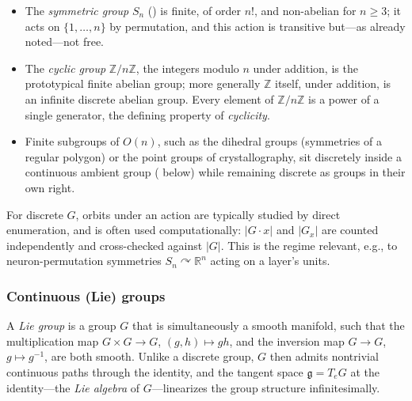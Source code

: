 \documentclass[mathematics,review,submit,moreauthors]{Definitions/mdpi}
\begin{document}
\begin{Example}
\label{ex:discrete-groups}
\begin{itemize}
    \item The \emph{symmetric group} $S_n$ () is
    finite, of order $n!$, and non-abelian for $n \geq 3$; it acts on
    $\{1,\dots,n\}$ by permutation, and this action is transitive but---as
    already noted---not free.
    \item The \emph{cyclic group} $\mathbb{Z}/n\mathbb{Z}$, the integers
    modulo $n$ under addition, is the prototypical finite abelian group; more
    generally $\mathbb{Z}$ itself, under addition, is an infinite discrete
    abelian group. Every element of $\mathbb{Z}/n\mathbb{Z}$ is a power of a
    single generator, the defining property of \emph{cyclicity}.
    \item Finite subgroups of $O(n)$, such as the dihedral groups
    (symmetries of a regular polygon) or the point groups of crystallography,
    sit discretely inside a continuous ambient group
    ( below) while remaining discrete as groups
    in their own right.
\end{itemize}
\end{Example}

For discrete $G$, orbits under an action are typically studied by direct
enumeration, and  is often used
computationally: $|G\cdot x|$ and $|G_x|$ are counted independently and
cross-checked against $|G|$. This is the regime relevant, e.g., to
neuron-permutation symmetries $S_n \curvearrowright \mathbb{R}^{n}$ acting on
a layer's units.

\subsubsection{Continuous (Lie) groups}
\label{subsubsec:lie-groups}

\begin{Definition}
\label{def:lie-group}
A \emph{Lie group} is a group $G$ that is simultaneously a smooth manifold,
such that the multiplication map $G \times G \to G$, $(g,h) \mapsto gh$, and
the inversion map $G \to G$, $g \mapsto g^{-1}$, are both smooth. Unlike a
discrete group, $G$ then admits nontrivial continuous paths through the
identity, and the tangent space $\mathfrak{g} = T_e G$ at the identity---the
\emph{Lie algebra} of $G$---linearizes the group structure infinitesimally.
\end{Definition}
\end{document}
